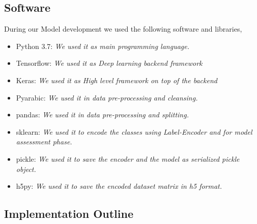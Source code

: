 \subsection{Software}

During our Model development we used the following software and libraries,

\begin{itemize}
 \item Python 3.7: \textit{We used it as main programming language.}
 \item Tensorflow: \textit{We used it as Deep learning backend framework}
 \item Keras: \textit{We used it as High level framework on top of the backend}
 \item Pyarabic: \textit{We used it in data pre-processing and cleansing.}
 \item pandas: \textit{We used it in data pre-processing and splitting.}
 \item sklearn: \textit{We used it to encode the classes using Label-Encoder and for model assessment phase.}
 \item pickle: \textit{We used it to save the encoder and the model as serialized pickle object.}
 \item h5py: \textit{We used it to save the encoded dataset matrix in h5 format.}
\end{itemize}

\subsection{Implementation Outline}

